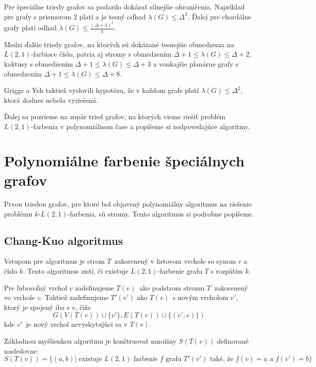 Pre špeciálne triedy grafov sa podarilo dokázať silnejšie ohraničenia. Napríklad
pre grafy s priemerom $2$ platí a je tesný odhad $\lambda(G) \leq \Delta^2$\cite{griggs_yeh_tree}.
Ďalej pre chordálne grafy platí odhad $\lambda(G) \leq \frac{\left( \Delta + 3 \right)^2}{4}$\cite{griggs_yeh_tree}.

Medzi ďalšie triedy grafov, na ktorých sú dokázané tesnejšie obmedzenia na $L(2,1)$-farbiace
číslo, patria aj stromy s obmedzením $\Delta + 1 \leq \lambda(G) \leq \Delta + 2$\cite{griggs_yeh_tree},
kaktusy s obmedzením $\Delta + 1 \leq \lambda(G) \leq \Delta + 3$\cite{kaktusy} a vonkajšie planárne
grafy s obmedzením $\Delta + 1 \leq \lambda(G) \leq \Delta + 8$\cite{outer_planar_bound}.

Griggs a Yeh taktiež vyslovili hypotézu, že v každom grafe platí $\lambda(G) \leq \Delta^2$,
ktorá dodnes nebola vyriešená.

Ďalej sa pozrieme na zopár tried grafov, na ktorých vieme riešiť problém $L(2,1)$-farbenia
v polynomiálnom čase a popíšeme si zodpovedajúce algoritmy.

\section{Polynomiálne farbenie špeciálnych grafov}

Prvou triedou grafov, pre ktoré bol objavený polynomiálny algoritmus na riešenie
problému $k$-$L(2,1)$-farbenia, sú stromy\cite{chang_kuo}. Tento algoritmus si
podrobne popíšeme.

\subsection{Chang-Kuo algoritmus}

Vstupom pre algoritmus je strom $T$ zakorenený v listovom vrchole so synom $r$ a číslo $k$.
Tento algoritmus zistí, či existuje $L(2,1)$-farbenie grafu $T$ s rozpätím $k$.

Pre ľubovoľný
vrchol $v$ zadefinujeme $T(v)$ ako podstrom stromu $T$ zakorenený vo vrchole $v$. Taktiež
zadefinujeme $T'(v')$ ako $T(v)$ s novým vrcholom $v'$, ktorý je spojený iba s $v$, čiže
$$ G\left(V(T(v)) \cup \{ v' \}, E(T(v)) \cup \{ (v', v)\} \right) $$
kde $v'$ je nový vrchol nevyskytujúci sa v $T(v)$.

Základnou myšlienkou algoritmu je konštruovať množiny $S(T(v))$ definované nasledovne:
$$S(T(v)) = \{ (a, b) | \textrm{ existuje } L(2,1) \textrm{ farbenie } f \textrm{ grafu } T'(v') \textrm{ také, že } f(v) = a \textrm{ a } f(v') = b\}$$


